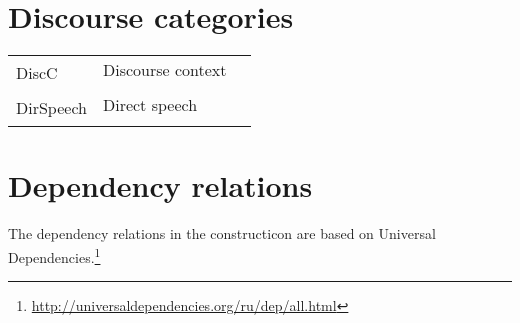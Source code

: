\documentclass[a4paper,11pt, onecolumn,twoside]{article}
\begin{document}
%
%

\section{Discourse categories}

\begin{tabular}{lll}
\multirow{2}{*}{DiscC} & Discourse context & \\
                    & & \\
\multirow{2}{*}{DirSpeech} & Direct speech & \\
                    & & \\
\end{tabular}

\section{Dependency relations}

The dependency relations in the constructicon are based on Universal Dependencies.\footnote{\url{http://universaldependencies.org/ru/dep/all.html}}
\end{document}
